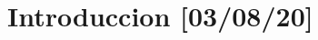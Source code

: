 \documentclass[10pt]{article}
\begin{document}
 
\maketitle

\section{Introduccion [03/08/20]}
\end{document}
